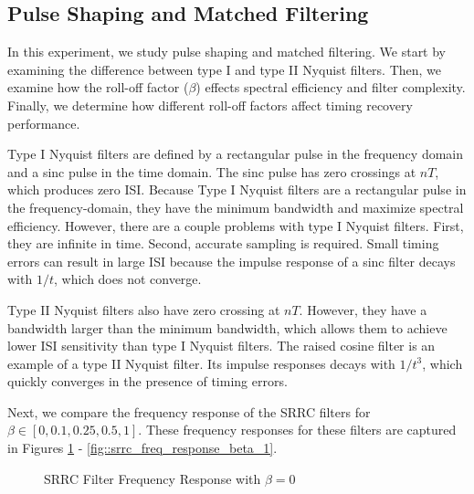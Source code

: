 \documentclass{article}
\begin{document}
\subsection{Pulse Shaping and Matched Filtering}

In this experiment, we study pulse shaping and matched filtering. We start by examining the difference between type I and type II Nyquist filters. Then, we examine how the roll-off factor ($\beta$) effects spectral efficiency and filter complexity. Finally, we determine how different roll-off factors affect timing recovery performance.

Type I Nyquist filters are defined by a rectangular pulse in the frequency domain and a sinc pulse in the time domain. The sinc pulse has zero crossings at $nT$, which produces zero ISI. Because Type I Nyquist filters are a rectangular pulse in the frequency-domain, they have the minimum bandwidth and maximize spectral efficiency. However, there are a couple problems with type I Nyquist filters. First, they are infinite in time. Second, accurate sampling is required. Small timing errors can result in large ISI because the impulse response of a sinc filter decays with $1/t$, which does not converge.

Type II Nyquist filters also have zero crossing at $nT$. However, they have a bandwidth larger than the minimum bandwidth, which allows them to achieve lower ISI sensitivity than type I Nyquist filters. The raised cosine filter is an example of a type II Nyquist filter. Its impulse responses decays with $1/t^3$, which quickly converges in the presence of timing errors.

Next, we compare the frequency response of the SRRC filters for $\beta \in [0,0.1,0.25,0.5,1]$. These frequency responses for these filters are captured in Figures \ref{fig::srrc_freq_response_beta_0} - \ref{fig::srrc_freq_response_beta_1}.

\begin{figure}[H]
	\centerline{}
	\caption{SRRC Filter Frequency Response with $\beta=0$}
	\label{fig::srrc_freq_response_beta_0}
\end{figure}
\end{document}
